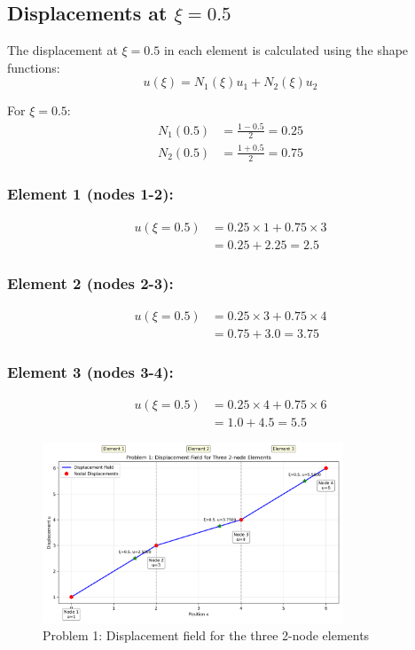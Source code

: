 \documentclass[12pt,a4paper]{article}
\begin{document}
\subsection{Displacements at $\xi = 0.5$}
The displacement at $\xi = 0.5$ in each element is calculated using the shape functions:
\begin{equation}
u(\xi) = N_1(\xi)u_1 + N_2(\xi)u_2
\end{equation}

For $\xi = 0.5$:
\begin{align}
N_1(0.5) &= \frac{1-0.5}{2} = 0.25 \\
N_2(0.5) &= \frac{1+0.5}{2} = 0.75
\end{align}

\subsubsection*{Element 1 (nodes 1-2):}
\begin{align}
u(\xi=0.5) &= 0.25 \times 1 + 0.75 \times 3 \\
&= 0.25 + 2.25 = 2.5
\end{align}

\subsubsection*{Element 2 (nodes 2-3):}
\begin{align}
u(\xi=0.5) &= 0.25 \times 3 + 0.75 \times 4 \\
&= 0.75 + 3.0 = 3.75
\end{align}

\subsubsection*{Element 3 (nodes 3-4):}
\begin{align}
u(\xi=0.5) &= 0.25 \times 4 + 0.75 \times 6 \\
&= 1.0 + 4.5 = 5.5
\end{align}

\begin{figure}[H]
\centering
\includegraphics[width=0.8\textwidth]{figures/ps3_problem1_displacement.png}
\caption{Problem 1: Displacement field for the three 2-node elements}
\label{fig:problem1_displacement}
\end{figure}
\end{document}
